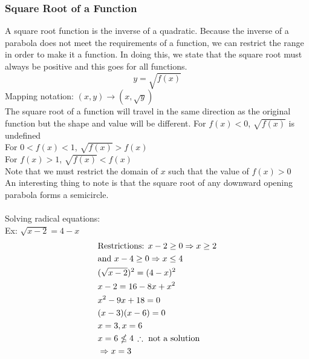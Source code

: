 \documentclass[11pt, fleqn]{article}
\begin{document}
\subsubsection{Square Root of a Function}
A square root function is the inverse of a quadratic. Because the inverse of a parabola does not meet the requirements of a function, we can restrict the range in order to make it a function. In doing this, we state that the square root must always be positive and this goes for all functions.
$$y=\sqrt{f(x)}$$
Mapping notation: $(x,y)\rightarrow(x,\sqrt{y})$\\
The square root of a function will travel in the same direction as the original function but the shape and value will be different.
For $f(x)<0$, $\sqrt{f(x)}$ is undefined\\
For $0<f(x)<1$, $\sqrt{f(x)}>f(x)$\\
For $f(x)>1$, $\sqrt{f(x)}<f(x)$\\
Note that we must restrict the domain of $x$ such that the value of $f(x)>0$\\
An interesting thing to note is that the square root of any downward opening parabola forms a semicircle.\\
\\
Solving radical equations:\\
Ex: $\sqrt{x-2}=4-x$
\begin{align*}
    &\text{Restrictions: }x-2\geq 0\Rightarrow x\geq 2\\
    &\text{and }x-4\geq 0\Rightarrow x\leq 4\\
    &(\sqrt{x-2})^2=(4-x)^2\\
    &x-2=16-8x+x^2\\
    &x^2-9x+18=0\\
    &(x-3)(x-6)=0\\
    &x=3,x=6\\
    &x=6\nleq 4\,\therefore \text{ not a solution}\\
    &\Rightarrow x=3
\end{align*}
\end{document}
